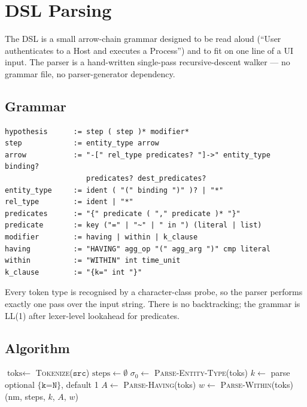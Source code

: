 \chapter{DSL Parsing}
\label{ch:dsl}

The DSL is a small arrow-chain grammar designed to be read aloud
(``User authenticates to a Host and executes a Process'') and to
fit on one line of a UI input. The parser is a hand-written
single-pass recursive-descent walker --- no grammar file, no
parser-generator dependency.

\section{Grammar}

\begin{verbatim}
hypothesis      := step ( step )* modifier*
step            := entity_type arrow
arrow           := "-[" rel_type predicates? "]->" entity_type binding?
                   predicates? dest_predicates?
entity_type     := ident ( "(" binding ")" )? | "*"
rel_type        := ident | "*"
predicates      := "{" predicate ( "," predicate )* "}"
predicate       := key ("=" | "~" | " in ") (literal | list)
modifier        := having | within | k_clause
having          := "HAVING" agg_op "(" agg_arg ")" cmp literal
within          := "WITHIN" int time_unit
k_clause        := "{k=" int "}"
\end{verbatim}

Every token type is recognised by a character-class probe, so the
parser performs exactly one pass over the input string. There is no
backtracking; the grammar is LL(1) after lexer-level lookahead for
predicates.

\section{Algorithm}

\begin{algorithm}
\caption{\textsc{Parse-Dsl}}\label{alg:parse-dsl}
$\text{toks} \gets $ \textsc{Tokenize}($\texttt{src}$) 
$\text{steps} \gets \emptyset$\;
$\sigma_0 \gets $ \textsc{Parse-Entity-Type}(toks)\;
$k \gets$ parse optional $\texttt{\{k=N\}}$, default 1\;
$A \gets$ \textsc{Parse-Having}(toks)\;
$w \gets$ \textsc{Parse-Within}(toks)\;
\Return {}(nm, steps, $k$, $A$, $w$)\;
\end{algorithm}

